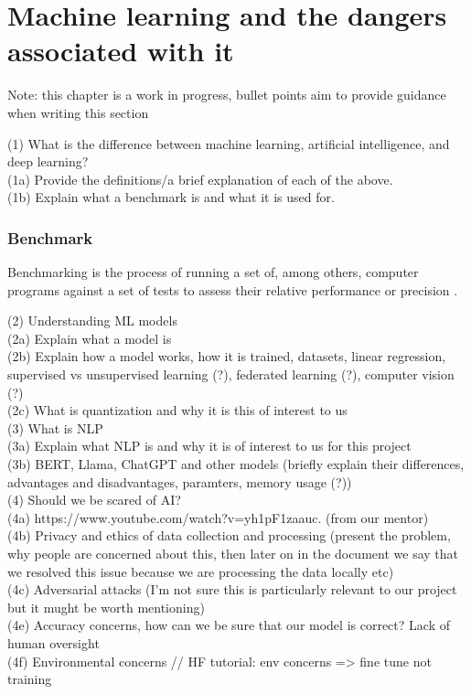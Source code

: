 \documentclass[licencjacka,en]{docs/pracamgr}
\begin{document}
\chapter{Machine learning and the dangers associated with it}
Note: this chapter is a work in progress, bullet points aim to provide guidance when writing this section

(1) What is the difference between machine learning, artificial intelligence, and deep learning? \\
(1a) Provide the definitions/a brief explanation of each of the above.\\
(1b) Explain what a benchmark is and what it is used for. \\

\subsection{Benchmark}
Benchmarking is the process of running a set of, among others, computer programs against a set of tests to assess their relative performance or precision \cite{benchmark}.

(2) Understanding ML models \\
(2a) Explain what a model is \\
(2b) Explain how a model works, how it is trained, datasets, linear regression, supervised vs unsupervised learning (?), federated learning (?), computer vision (?) \\
(2c) What is quantization and why it is this of interest to us \\

(3) What is NLP \\
(3a) Explain what NLP is and why it is of interest to us for this project \\
(3b) BERT, Llama, ChatGPT and other models (briefly explain their differences, advantages and disadvantages, paramters, memory usage (?)) \\

(4) Should we be scared of AI? \\
(4a) https://www.youtube.com/watch?v=yh1pF1zaauc. (from our mentor) \\
(4b) Privacy and ethics of data collection and processing (present the problem, why people are concerned about this, then later on in the document we say that we resolved this issue because we are processing the data locally etc) \\
(4c) Adversarial attacks (I'm not sure this is particularly relevant to our project but it mught be worth mentioning) \\
(4e) Accuracy concerns, how can we be sure that our model is correct? Lack of human oversight \\
(4f) Environmental concerns
// HF tutorial: env concerns => fine tune not training 
\end{document}
